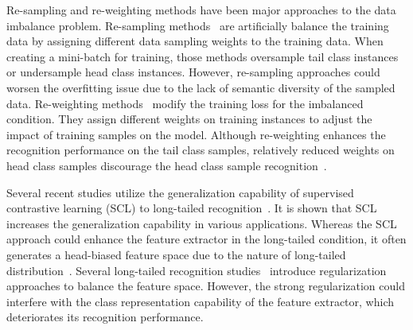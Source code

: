 \documentclass[10pt,twocolumn,letterpaper]{article}
\begin{document}
Re-sampling and re-weighting methods have been major approaches to the data imbalance problem.
Re-sampling methods~\cite{chawla2002smote, buda2018systematic, more2016survey, zhang2021bag} are artificially balance the training data by assigning different data sampling weights to the training data. When creating a mini-batch for training, those methods oversample tail class instances or undersample head class instances.
However, re-sampling approaches could worsen the overfitting issue due to the lack of semantic diversity of the sampled data.
Re-weighting methods~\cite{cao2019learning, cui2019class, ren2020balanced, lin2017focal, li2022equalized} modify the training loss for the imbalanced condition. They assign different weights on training instances to adjust the impact of training samples on the model.
Although re-weighting enhances the recognition performance on the tail class samples, relatively reduced weights on head class samples discourage the head class sample recognition~\cite{kang2019decoupling}.



Several recent studies utilize the generalization capability of supervised contrastive learning (SCL) to long-tailed recognition~\cite{KCL, TSC}.
It is shown that SCL increases the generalization capability in various applications. Whereas the SCL approach could enhance the feature extractor in the long-tailed condition, it often generates a head-biased feature space due to the nature of long-tailed distribution~\cite{KCL}.
Several long-tailed recognition studies~\cite{KCL, TSC, BCL} introduce regularization approaches to balance the feature space.
However, the strong regularization could interfere with the class representation capability of the feature extractor, which deteriorates its recognition performance.
\end{document}
